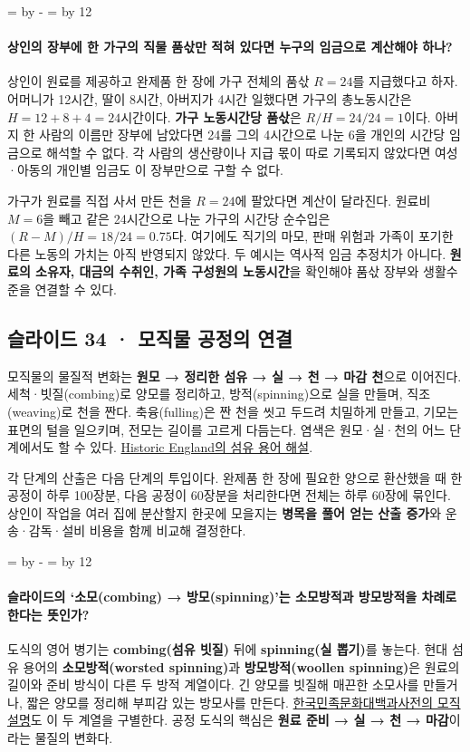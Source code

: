 \documentclass[10pt,a4paper]{article}
\newcommand{\ReserveQuestionSpace}{%
  \par\begingroup
  \dimen0=\pagegoal \advance\dimen0 by -\pagetotal
  \dimen2=\baselineskip \multiply\dimen2 by 12
  \ifdim\dimen0<\dimen2 \newpage\fi
  \endgroup}
\begin{document}
\ReserveQuestionSpace
\paragraph{상인의 장부에 한 가구의 직물 품삯만 적혀 있다면 누구의 임금으로 계산해야 하나?}
상인이 원료를 제공하고 완제품 한 장에 가구 전체의 품삯 $R=24$를 지급했다고 하자. 어머니가 12시간, 딸이 8시간, 아버지가 4시간 일했다면 가구의 총노동시간은 $H=12+8+4=24$시간이다. \textbf{가구 노동시간당 품삯}은 $R/H=24/24=1$이다. 아버지 한 사람의 이름만 장부에 남았다면 24를 그의 4시간으로 나눈 6을 개인의 시간당 임금으로 해석할 수 없다. 각 사람의 생산량이나 지급 몫이 따로 기록되지 않았다면 여성·아동의 개인별 임금도 이 장부만으로 구할 수 없다.\par

가구가 원료를 직접 사서 만든 천을 $R=24$에 팔았다면 계산이 달라진다. 원료비 $M=6$을 빼고 같은 24시간으로 나눈 가구의 시간당 순수입은 $(R-M)/H=18/24=0.75$다. 여기에도 직기의 마모, 판매 위험과 가족이 포기한 다른 노동의 가치는 아직 반영되지 않았다. 두 예시는 역사적 임금 추정치가 아니다. \textbf{원료의 소유자, 대금의 수취인, 가족 구성원의 노동시간}을 확인해야 품삯 장부와 생활수준을 연결할 수 있다.\par

\subsection{슬라이드 34 · 모직물 공정의 연결}
모직물의 물질적 변화는 \textbf{원모 → 정리한 섬유 → 실 → 천 → 마감 천}으로 이어진다. 세척·빗질(combing)로 양모를 정리하고, 방적(spinning)으로 실을 만들며, 직조(weaving)로 천을 짠다. 축융(fulling)은 짠 천을 씻고 두드려 치밀하게 만들고, 기모는 표면의 털을 일으키며, 전모는 길이를 고르게 다듬는다. 염색은 원모·실·천의 어느 단계에서도 할 수 있다. \href{https://historicengland.org.uk/services-skills/education/glossary/}{Historic England의 섬유 용어 해설}.\par

각 단계의 산출은 다음 단계의 투입이다. 완제품 한 장에 필요한 양으로 환산했을 때 한 공정이 하루 100장분, 다음 공정이 60장분을 처리한다면 전체는 하루 60장에 묶인다. 상인이 작업을 여러 집에 분산할지 한곳에 모을지는 \textbf{병목을 풀어 얻는 산출 증가}와 운송·감독·설비 비용을 함께 비교해 결정한다.\par

\ReserveQuestionSpace
\paragraph{슬라이드의 ‘소모(combing) → 방모(spinning)’는 소모방적과 방모방적을 차례로 한다는 뜻인가?}
도식의 영어 병기는 \textbf{combing(섬유 빗질)} 뒤에 \textbf{spinning(실 뽑기)}를 놓는다. 현대 섬유 용어의 \textbf{소모방적(worsted spinning)}과 \textbf{방모방적(woollen spinning)}은 원료의 길이와 준비 방식이 다른 두 방적 계열이다. 긴 양모를 빗질해 매끈한 소모사를 만들거나, 짧은 양모를 정리해 부피감 있는 방모사를 만든다. \href{https://encykorea.aks.ac.kr/Article/E0018563}{한국민족문화대백과사전의 모직 설명}도 이 두 계열을 구별한다. 공정 도식의 핵심은 \textbf{원료 준비 → 실 → 천 → 마감}이라는 물질의 변화다.\par
\end{document}
